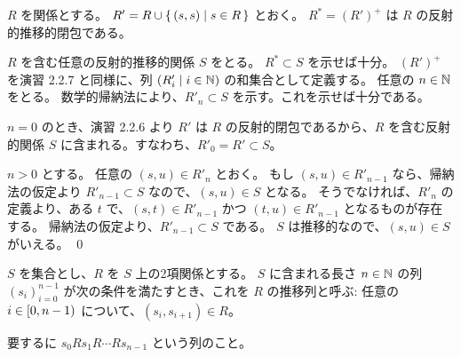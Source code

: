 \begin{jtheorem}[反射的推移的閉包の構成的定義]
  \label{反射的推移的閉包の構成的定義}
  $R$ を関係とする。
  $R' = R \cup \{\,(s, s) \mid s \in R\,\}$ とおく。
  $R^* = (R')^+$ は $R$ の反射的推移的閉包である。
\end{jtheorem}
\begin{jproof}
  $R$ を含む任意の反射的推移的関係 $S$ をとる。
  $R^* \subset S$ を示せば十分。
  $(R')^+$ を演習 2.2.7 と同様に、列 $(R'_i \mid i \in \mathbb{N})$ の和集合として定義する。
  任意の $n \in \mathbb{N}$ をとる。
  数学的帰納法により、$R'_n \subset S$ を示す。これを示せば十分である。

  $n = 0$ のとき、演習 2.2.6 より $R'$ は $R$ の反射的閉包であるから、$R$ を含む反射的関係 $S$ に含まれる。すなわち、$R'_0 = R' \subset S$。

  $n > 0$ とする。
  任意の $(s, u) \in R'_n$ とおく。
  もし $(s, u) \in R'_{n-1}$ なら、帰納法の仮定より $R'_{n-1} \subset S$ なので、$(s, u) \in S$ となる。
  そうでなければ、$R'_n$ の定義より、ある $t$ で、$(s, t) \in R'_{n-1}$ かつ $(t, u) \in R'_{n-1}$ となるものが存在する。
  帰納法の仮定より、$R'_{n-1} \subset S$ である。
  $S$ は推移的なので、$(s, u) \in S$ がいえる。
  \qed
\end{jproof}

\begin{jdefinition}[推移列]
  $S$ を集合とし、$R$ を $S$ 上の2項関係とする。
  $S$ に含まれる長さ $n \in \mathbb{N}$ の列 $(s_i)_{i=0}^{n-1}$ が次の条件を満たすとき、これを $R$ の推移列と呼ぶ:
  任意の $i \in [0, n-1)$ について、$(s_i, s_{i+1}) \in R$。
\end{jdefinition}
\begin{jremark*}
  要するに $s_0 R s_1 R \cdots R s_{n-1}$ という列のこと。
\end{jremark*}

